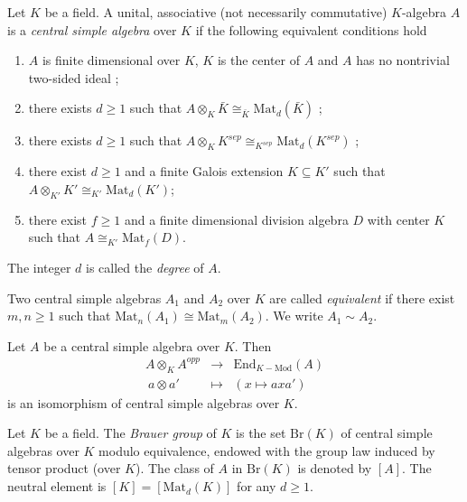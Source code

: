 \begin{theorem}
\label{theorem-central-simple-algebra}
Let $K$ be a field. A unital, associative (not necessarily commutative)
$K$-algebra $A$ is a {\it central simple algebra} over $K$ if the following
equivalent conditions hold
\begin{enumerate}
\item
$A$ is finite dimensional over $K$, $K$ is the center of $A$ and $A$ has no
nontrivial two-sided ideal ;
\item
there exists $d \geq 1$ such that $A \otimes_K \bar K \cong_{\bar K}
\text{Mat}_d(\bar K)$ ;
\item
there exists $d \geq 1$ such that $A \otimes_K K^{sep} \cong_{K^{sep}}
\text{Mat}_d(K^{sep})$ ;
\item
there exist $d \geq 1$ and a finite Galois extension $K \subseteq K'$ such that
$A \otimes_{K'} K' \cong_{K'} \text{Mat}_d(K')$;
\item
there exist $f \geq 1$ and a finite dimensional division algebra $D$ with
center $K$ such that $A \cong_{K'} \text{Mat}_f(D)$.
\end{enumerate}
The integer $d$ is called the {\it degree} of $A$.
\end{theorem}

\begin{definition}
\label{definition-brauer-equivalent}
Two central simple algebras $A_1$ and $A_2$ over $K$ are called
{\it equivalent} if there exist $m, n \geq 1$ such that $\text{Mat}_n(A_1)
\cong \text{Mat}_m(A_2)$. We write $A_1 \sim A_2$.
\end{definition}

\begin{lemma}
\label{lemma-brauer-inverse}
Let $A$ be a central simple algebra over $K$. Then
$$
\begin{matrix}
A \otimes_K A^{opp} & \longrightarrow & \text{End}_{K-\text{Mod}}(A) \\
\ a \otimes a' & \longmapsto & (x \mapsto a x a')
\end{matrix}
$$
is an isomorphism of central simple algebras over $K$.
\end{lemma}

\begin{definition}
\label{definition-brauer-group}
Let $K$ be a field. The {\it Brauer group} of $K$ is the set $\text{Br} (K)$
of central simple algebras over $K$ modulo equivalence, endowed with the group
law induced by tensor product (over $K$). The class of $A$ in $\text{Br} (K)$
is denoted by $[A]$. The neutral element is $[K] = [\text{Mat}_d(K)]$ for any
$d \geq 1$.
\end{definition}

